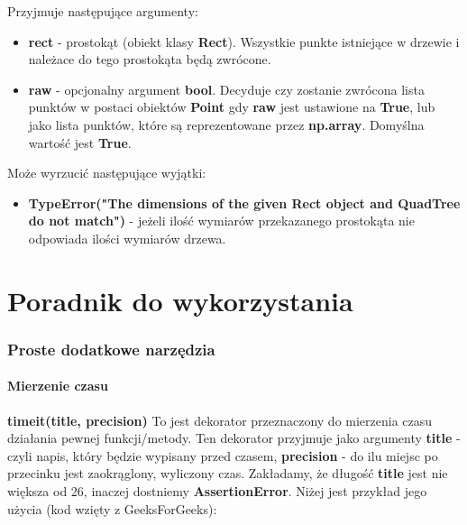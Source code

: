 \documentclass[a4paper, 12pt]{article}
\begin{document}
\begin{itemize}
        \noindent
        \quad Przyjmuje następujące argumenty:
        \begin{itemize}
            \item \textbf{rect} - prostokąt (obiekt klasy \textbf{Rect}). Wszystkie punkte istniejące w drzewie i należace do tego prostokąta będą zwrócone.
            \item \textbf{raw} - opcjonalny argument \textbf{bool}. Decyduje czy zostanie zwrócona lista punktów w postaci obiektów \textbf{Point} gdy \textbf{raw} jest ustawione na \textbf{True}, lub jako lista punktów, które są reprezentowane przez \textbf{np.array}. Domyślna wartość jest \textbf{True}.
        \end{itemize}
        
        \noindent
        \quad Może wyrzucić następujące wyjątki:
        \begin{itemize}
            \item \textbf{TypeError("The dimensions of the given Rect object and QuadTree do not match")} - jeżeli ilość wymiarów przekazanego prostokąta nie odpowiada ilości wymiarów drzewa.
        \end{itemize}
        \vspace{6pt}
    \end{itemize}

\newpage
\part{Poradnik do wykorzystania}
  \setcounter{section}{0}
  \section{Proste dodatkowe narzędzia}

    \subsection{Mierzenie czasu}
      \textbf{timeit(title, precision)} \vspace{6pt}\newline
      \quad To jest dekorator przeznaczony do mierzenia czasu działania pewnej funkcji/metody. Ten dekorator przyjmuje jako argumenty \textbf{title} - czyli napis, który będzie wypisany przed czasem, \textbf{precision} - do ilu miejsc po przecinku jest zaokrąglony, wyliczony czas. Zakładamy, że długość \textbf{title} jest nie większa od 26, inaczej dostniemy \textbf{AssertionError}. Niżej jest przykład jego użycia (kod wzięty z GeeksForGeeks):
\end{document}
